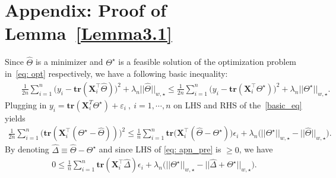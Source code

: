 \documentclass[12pt]{article}
\begin{document}
\newpage
\section{Appendix: Proof of Lemma~\ref{Lemma3.1}}
Since $\widehat{\Theta}$ is a minimizer and $\Theta^{\star}$ is a feasible solution of the optimization problem in~\eqref{eq: opt} respectively, we have a following basic inequality:
\begin{eqnarray} \label{basic_eq}
& & \frac{1}{2n}\sum^{n}_{i=1} \big( y_{i} - \textbf{tr}(\mathbf{X}_{i}^{\top}\widehat{\Theta}) \big)^{2} + \lambda_{n}||\widehat{\Theta}||_{w,\star}  \leq 
\frac{1}{2n}\sum^{n}_{i=1}\big( y_{i} - \textbf{tr}(\mathbf{X}_{i}^{\top}\Theta^{\star}) \big)^{2} + \lambda_{n}||\Theta^{\star}||_{w,\star}.
\end{eqnarray}
Plugging in $ y_{i} = \textbf{tr}(\mathbf{X}^{T}_{i}\Theta^\star) + \varepsilon_{i} \ ,\ i = 1, \cdots, n$ on LHS and RHS of the~\eqref{basic_eq} yields
\begin{align}
    \frac{1}{2n}\sum^{n}_{i=1}\big(\textbf{tr}(\mathbf{X}_{i}^{\top}(\Theta^{\star} - \widehat{\Theta}))\big)^{2} \leq \frac{1}{n} \sum^{n}_{i=1} \textbf{tr}\big( \mathbf{X}_{i}^{\top}(\widehat{\Theta} - \Theta^{\star}) \big)\epsilon_{i} + 
    \lambda_{n} \big( ||\Theta^{\star}||_{w,\star} - ||\widehat{\Theta}||_{w,\star} \big). \label{eq: apn_pre}
\end{align}
By denoting $\widehat{\Delta} \equiv \widehat{\Theta} - \Theta^{\star}$ and since LHS of \eqref{eq: apn_pre} is $\geq 0$, we have 
\begin{eqnarray}
    0 \leq \frac{1}{n}\sum^{n}_{i=1}\textbf{tr}(\mathbf{X}_{i}^{\top}\widehat{\Delta})\epsilon_{i} + \lambda_{n}\big( ||\Theta^{\star}||_{w,\star} - ||\widehat{\Delta} + \Theta^{\star}||_{w,\star} \big).  \label{eq: apn_main}
\end{eqnarray}
\end{document}
